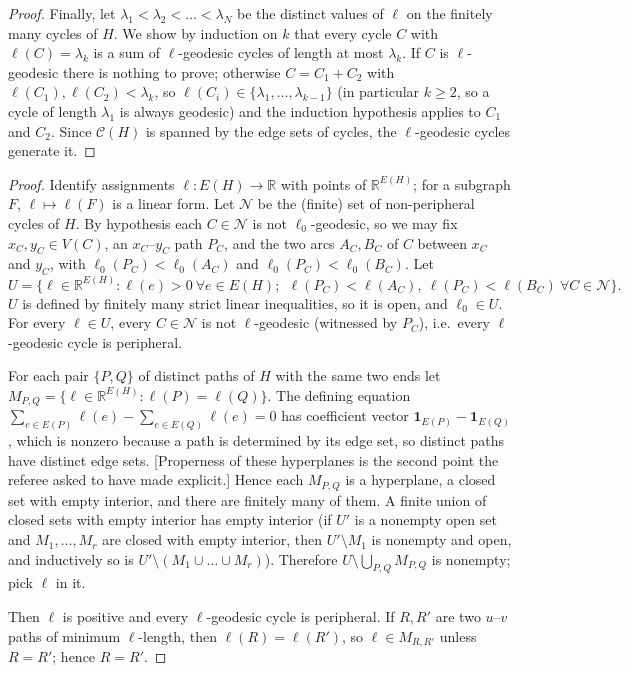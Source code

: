 \documentclass[11pt,a4paper]{article}
\theoremstyle{plain}
\theoremstyle{definition}
\theoremstyle{remark}
\newcommand{\R}{\mathbb R}
\newcommand{\cyc}{\mathcal C}
\begin{document}
\begin{proof}
Finally, let $\lambda_1<\lambda_2<\dots<\lambda_N$ be the distinct values of $\ell$ on the finitely many cycles of $H$. We show by induction on $k$ that every cycle $C$ with $\ell(C)=\lambda_k$ is a sum of $\ell$-geodesic cycles of length at most $\lambda_k$. If $C$ is $\ell$-geodesic there is nothing to prove; otherwise $C=C_1+C_2$ with $\ell(C_1),\ell(C_2)<\lambda_k$, so $\ell(C_i)\in\{\lambda_1,\dots,\lambda_{k-1}\}$ (in particular $k\ge2$, so a cycle of length $\lambda_1$ is always geodesic) and the induction hypothesis applies to $C_1$ and $C_2$. Since $\cyc(H)$ is spanned by the edge sets of cycles, the $\ell$-geodesic cycles generate it.
\end{proof}

\label{pf:perturb}
\lemperturb*
\begin{proof}
Identify assignments $\ell\colon E(H)\to\R$ with points of $\R^{E(H)}$; for a subgraph $F$, $\ell\mapsto\ell(F)$ is a linear form. Let $\mathcal N$ be the (finite) set of non-peripheral cycles of $H$. By hypothesis each $C\in\mathcal N$ is not $\ell_0$-geodesic, so we may fix $x_C,y_C\in V(C)$, an $x_C$--$y_C$ path $P_C$, and the two arcs $A_C,B_C$ of $C$ between $x_C$ and $y_C$, with $\ell_0(P_C)<\ell_0(A_C)$ and $\ell_0(P_C)<\ell_0(B_C)$. Let
\[
U=\bigl\{\ell\in\R^{E(H)} : \ell(e)>0\ \forall e\in E(H);\ \ \ell(P_C)<\ell(A_C),\ \ell(P_C)<\ell(B_C)\ \forall C\in\mathcal N\bigr\}.
\]
$U$ is defined by finitely many strict linear inequalities, so it is open, and $\ell_0\in U$. For every $\ell\in U$, every $C\in\mathcal N$ is not $\ell$-geodesic (witnessed by $P_C$), i.e.\ every $\ell$-geodesic cycle is peripheral.

For each pair $\{P,Q\}$ of distinct paths of $H$ with the same two ends let $M_{P,Q}=\{\ell\in\R^{E(H)}:\ell(P)=\ell(Q)\}$. The defining equation $\sum_{e\in E(P)}\ell(e)-\sum_{e\in E(Q)}\ell(e)=0$ has coefficient vector $\mathbf 1_{E(P)}-\mathbf 1_{E(Q)}$, which is nonzero because a path is determined by its edge set, so distinct paths have distinct edge sets. [Properness of these hyperplanes is the second point the referee asked to have made explicit.] Hence each $M_{P,Q}$ is a hyperplane, a closed set with empty interior, and there are finitely many of them. A finite union of closed sets with empty interior has empty interior (if $U'$ is a nonempty open set and $M_1,\dots,M_r$ are closed with empty interior, then $U'\setminus M_1$ is nonempty and open, and inductively so is $U'\setminus(M_1\cup\dots\cup M_r)$). Therefore $U\setminus\bigcup_{P,Q}M_{P,Q}$ is nonempty; pick $\ell$ in it.

Then $\ell$ is positive and every $\ell$-geodesic cycle is peripheral. If $R,R'$ are two $u$--$v$ paths of minimum $\ell$-length, then $\ell(R)=\ell(R')$, so $\ell\in M_{R,R'}$ unless $R=R'$; hence $R=R'$.
\end{proof}
\end{document}
